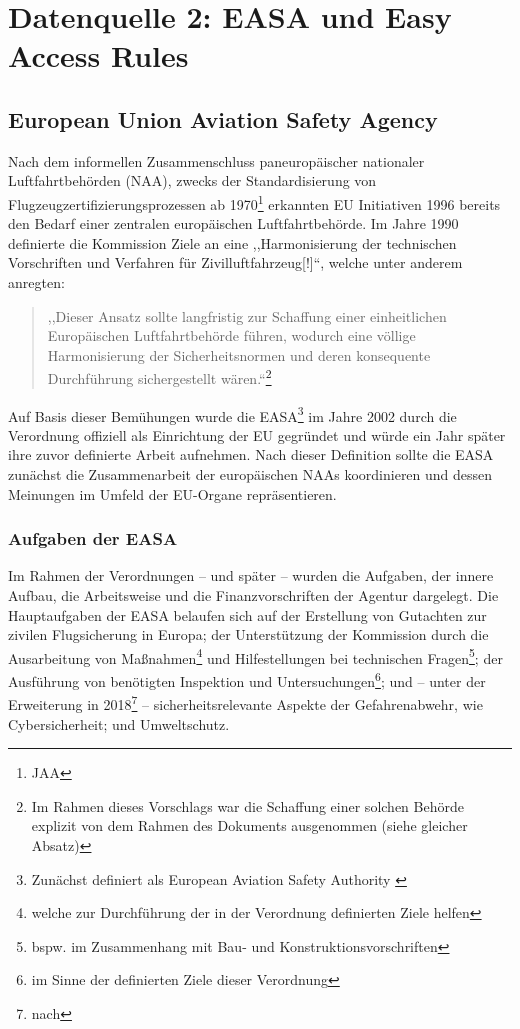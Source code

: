 \chapter{Datenquelle 2: EASA und Easy Access Rules}

\section{European Union Aviation Safety Agency}
    
    Nach dem informellen Zusammenschluss paneuropäischer nationaler Luftfahrtbehörden (\acs{NAA}), zwecks der Standardisierung von Flugzeugzertifizierungsprozessen ab 1970\footnote{\acf{JAA}} erkannten \ac{EU} Initiativen 1996 bereits den Bedarf einer zentralen europäischen Luftfahrtbehörde.
    Im Jahre 1990 definierte die Kommission Ziele an eine ,,Harmonisierung der technischen Vorschriften und Verfahren für Zivilluftfahrzeug[!]``\cite{kom_90_442}, welche unter anderem anregten: 
    
    \begin{quote}
        ,,Dieser Ansatz sollte langfristig zur Schaffung einer einheitlichen Europäischen Luftfahrtbehörde führen, wodurch eine völlige Harmonisierung der Sicherheitsnormen und deren konsequente Durchführung sichergestellt wären.``\footnote{Im Rahmen dieses Vorschlags war die Schaffung einer solchen Behörde explizit von dem Rahmen des Dokuments ausgenommen (siehe gleicher Absatz)} \cite[Begr. Art. 7 Abs. 2]{kom_90_442}
    \end{quote}
    Auf Basis dieser Bemühungen wurde die \acf{EASA}\footnote{Zunächst definiert als European Aviation Safety Authority \cite[2]{easa_framework}} im Jahre 2002 durch die Verordnung  offiziell als Einrichtung der \ac{EU} gegründet und würde ein Jahr später ihre zuvor definierte Arbeit aufnehmen.
    Nach dieser Definition sollte die \ac{EASA} zunächst die Zusammenarbeit der europäischen \acsp{NAA} koordinieren und dessen Meinungen im Umfeld der \ac{EU}-Organe repräsentieren. 
    \cite[§4.3]{easa_coman2018}

\subsection{Aufgaben der EASA}
    
    Im Rahmen der Verordnungen  -- und später  -- wurden die Aufgaben, der innere Aufbau, die Arbeitsweise und die Finanzvorschriften der Agentur dargelegt.
    Die Hauptaufgaben der \ac{EASA} belaufen sich auf der Erstellung von Gutachten zur zivilen Flugsicherung in Europa; der Unterstützung der Kommission durch die Ausarbeitung von Maßnahmen\footnote{welche zur Durchführung der in der Verordnung definierten Ziele helfen} und Hilfestellungen bei technischen Fragen\footnote{bspw. im Zusammenhang mit Bau- und Konstruktionsvorschriften}; der Ausführung von benötigten Inspektion und Untersuchungen\footnote{im Sinne der definierten Ziele dieser Verordnung}; und -- unter der Erweiterung in 2018\footnote{nach } -- sicherheitsrelevante Aspekte der Gefahrenabwehr, wie Cybersicherheit; und Umweltschutz. \cite{2008R0216_summary, 2018R1139_summary}
    
